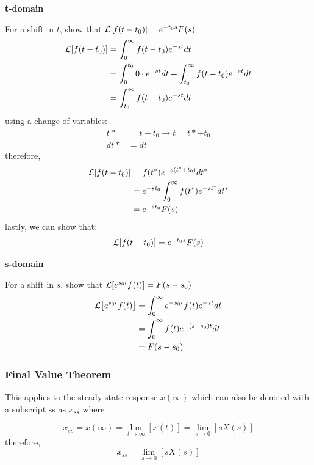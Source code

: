 \documentclass[12pt,letter]{article}
\begin{document}
\begin{bookproof}
\noindent \textbf{t-domain}

For a shift in $t$, show that $\mathcal{L}{\left[f(t-t_0)\right]} = e^{-t_0s}F(s)$
\begin{align}
\mathcal{L}{\left[f(t-t_0)\right]} &= \int_0^\infty f(t-t_0) e^{-st}dt  \\
&= \int_0^{t_0} 0 \cdot e^{-st}dt + \int_{t_0}^\infty f(t-t_0) e^{-st}dt  \nonumber \\
&= \int_{t_0}^\infty f(t-t_0) e^{-st}dt  \nonumber
\end{align}
using a change of variables:
\begin{align}
t* &= t-t_0 \rightarrow t = t*+t_0\\
dt* &= dt  \nonumber
\end{align}
therefore, 
\begin{align}
\mathcal{L}{\left[f(t-t_0)\right]} &= f(t^*)e^{-s(t^*+t_0)}dt^*     \\
&= e^{-s t_0} \int_0^{\infty} f(t^*)e^{-s t^*}dt^*  \nonumber \\
&= e^{-s t_0} F(s)  \nonumber
\end{align}
lastly, we can show that:
\begin{equation}
\mathcal{L}{\left[f(t-t_0)\right]} = e^{-t_0s}F(s)
\end{equation}

\noindent \textbf{s-domain}

For a shift in $s$, show that $\mathcal{L}{\left[e^{s_0t}f(t)\right]} = F(s-s_0)$
\begin{align}
\mathcal{L}{\left[e^{s_0t}f(t)\right]} &= \int_0^{\infty} e^{-s_0 t}  f(t)e^{-s t}dt  \nonumber \\
&=\int_0^{\infty} f(t)e^{-(s-s_0) t}dt  \nonumber \\
&= F(s-s_0)
\end{align}

\end{bookproof}

 


\subsubsection{Final Value Theorem}
This applies to the steady state response $x(\infty)$ which can also be denoted with a subscript ss as $x_{ss}$ where

\begin{equation}
x_{ss} = x(\infty)  = \lim\limits_{t\rightarrow \infty} [x(t)]  =  \lim\limits_{s\rightarrow 0} [s X(s)]
\end{equation}
therefore, 
\begin{equation}
x_{ss} =  \lim\limits_{s\rightarrow 0} [s X(s)]
\end{equation}
\end{document}
